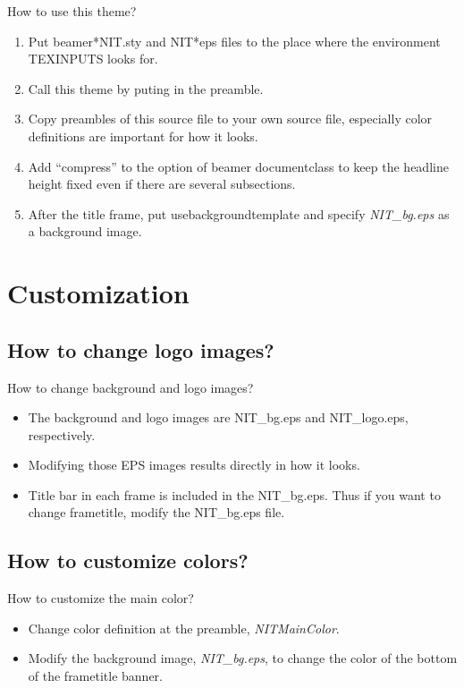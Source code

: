 \documentclass[10pt,dvipdfmx,m,compress]{beamer}
\begin{document}
  \begin{frame}{How to use this theme?}
   \begin{enumerate}
    \item Put beamer*NIT.sty and NIT*eps files to the place where the environment TEXINPUTS looks for.
    \item Call this theme by puting  in the preamble.
    \item Copy preambles of this source file to your own source file, especially color definitions are important for how it looks.
    \item Add ``compress'' to the option of beamer documentclass to keep the headline height fixed even if there are several subsections.
    \item After the title frame, put usebackgroundtemplate and specify {\itshape NIT\_bg.eps} as a background image.
   \end{enumerate}
  \end{frame}

 \section{Customization}
  \subsection{How to change logo images?} %
  \begin{frame}{How to change background and logo images?}
   \begin{itemize}
    \item The background and logo images are NIT\_bg.eps and NIT\_logo.eps, respectively.
    \item Modifying those EPS images results directly in how it looks.
    \item Title bar in each frame is included in the NIT\_bg.eps. Thus if you want to change frametitle, modify the NIT\_bg.eps file.
   \end{itemize}
  \end{frame}
  
  \subsection{How to customize colors?}
  \begin{frame}{How to customize the main color?}
   \begin{itemize}
    \item Change color definition at the preamble, {\itshape NITMainColor}.
    \item Modify the background image, {\itshape NIT\_bg.eps}, to change the color of the bottom of the frametitle banner.
   \end{itemize}
  \end{frame}
\end{document}
